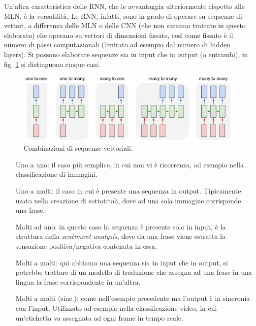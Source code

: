Un'altra caratteristica delle RNN, che le avvantaggia ulteriormente rispetto alle MLN, è la versatilità. Le RNN, infatti, sono in grado di operare su sequenze di vettori, a differenza delle MLN o delle CNN (che non saranno trattate in questo elaborato) che operano su vettori di dimensioni fissate, così come fissato è il numero di passi computazionali (limitato ad esempio dal numero di hidden layers). Si possono elaborare sequenze sia in input che in output (o entrambi), in fig. \ref{fig:1.7} si distinguono cinque casi.
\newpage
\begin{figure}[ht]
	\centering
	\includegraphics{img/rnn_seq.jpg}
	\caption{Combinazioni di sequenze vettoriali. \cite{rnn_effect}}
	\label{fig:1.7}
\end{figure}

\begin{enumerate}
	\item[Uno a uno:] il caso più semplice, in cui non vi è ricorrenza, ad esempio nella classificazione di immagini.
	\item[Uno a molti:] il caso in cui è presente una sequenza in output. Tipicamente usato nella creazione di sottotitoli, dove ad una sola immagine corrisponde una frase.
	\item[Molti ad uno:] in questo caso la sequenza è presente solo in input, è la struttura della \textit{sentiment analysis}, dove da una frase viene estratta la sensazione positiva/negativa contenuta in essa.
	\item[Molti a molti:] qui abbiamo una sequenza sia in input che in output, si potrebbe trattare di un modello di traduzione che assegna ad una frase in una lingua la frase corrispondente in un'altra.
	\item[Molti a molti (sinc.):] come nell'esempio precedente ma l'output è in sincronia con l'input. Utilizzato ad esempio nella classificazione video, in cui un'etichetta va assegnata ad ogni frame in tempo reale.
\end{enumerate}

